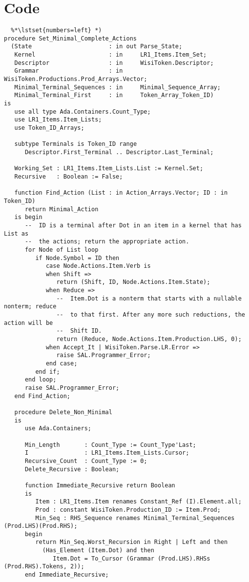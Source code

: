 \documentclass{article}
\begin{document}
\section{Code}
\label{code}
\begin{lstlisting}
  %*\lstset{numbers=left} *)
procedure Set_Minimal_Complete_Actions
  (State                      : in out Parse_State;
   Kernel                     : in     LR1_Items.Item_Set;
   Descriptor                 : in     WisiToken.Descriptor;
   Grammar                    : in     WisiToken.Productions.Prod_Arrays.Vector;
   Minimal_Terminal_Sequences : in     Minimal_Sequence_Array;
   Minimal_Terminal_First     : in     Token_Array_Token_ID)
is
   use all type Ada.Containers.Count_Type;
   use LR1_Items.Item_Lists;
   use Token_ID_Arrays;

   subtype Terminals is Token_ID range
      Descriptor.First_Terminal .. Descriptor.Last_Terminal;

   Working_Set : LR1_Items.Item_Lists.List := Kernel.Set;
   Recursive   : Boolean := False;

   function Find_Action (List : in Action_Arrays.Vector; ID : in Token_ID)
      return Minimal_Action
   is begin
      --  ID is a terminal after Dot in an item in a kernel that has List as
      --  the actions; return the appropriate action.
      for Node of List loop
         if Node.Symbol = ID then
            case Node.Actions.Item.Verb is
            when Shift =>
               return (Shift, ID, Node.Actions.Item.State);
            when Reduce =>
               --  Item.Dot is a nonterm that starts with a nullable nonterm; reduce
               --  to that first. After any more such reductions, the action will be
               --  Shift ID.
               return (Reduce, Node.Actions.Item.Production.LHS, 0);
            when Accept_It | WisiToken.Parse.LR.Error =>
               raise SAL.Programmer_Error;
            end case;
         end if;
      end loop;
      raise SAL.Programmer_Error;
   end Find_Action;

   procedure Delete_Non_Minimal
   is
      use Ada.Containers;

      Min_Length       : Count_Type := Count_Type'Last;
      I                : LR1_Items.Item_Lists.Cursor;
      Recursive_Count  : Count_Type := 0;
      Delete_Recursive : Boolean;

      function Immediate_Recursive return Boolean
      is
         Item : LR1_Items.Item renames Constant_Ref (I).Element.all;
         Prod : constant WisiToken.Production_ID := Item.Prod;
         Min_Seq : RHS_Sequence renames Minimal_Terminal_Sequences (Prod.LHS)(Prod.RHS);
      begin
         return Min_Seq.Worst_Recursion in Right | Left and then
           (Has_Element (Item.Dot) and then
              Item.Dot = To_Cursor (Grammar (Prod.LHS).RHSs (Prod.RHS).Tokens, 2));
      end Immediate_Recursive;


\end{lstlisting}
\end{document}
